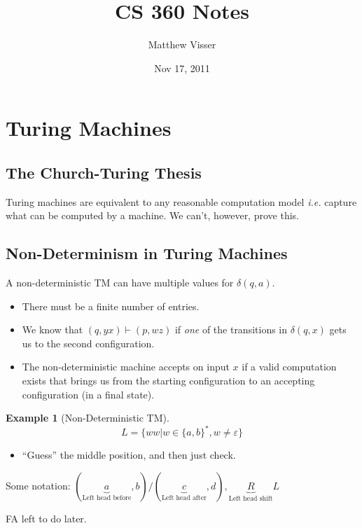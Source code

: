\documentclass[12pt]{article}
\theoremstyle{definition}
\newtheorem{exmpl}{Example}
\begin{document}
\title{CS 360 Notes}
\author{Matthew Visser}
\date{Nov 17, 2011}
\maketitle

\section{Turing Machines}

\subsection{The Church-Turing Thesis}

Turing machines are equivalent to any reasonable computation model \textit{i.e.}
capture what can be computed by a machine. We can't, however, prove this.

\subsection{Non-Determinism in Turing Machines}

A non-deterministic TM can have multiple values for $\delta(q,a)$.

\begin{itemize}
	\item There must be a finite number of entries.
	\item We know that $(q,yx) \vdash (p,wz)$ if \emph{one} of the transitions in
		$\delta(q,x)$ gets us to the second configuration.
	\item The non-deterministic machine accepts on input $x$ if a valid
		computation exists that brings us from the starting configuration to an
		accepting configuration (in a final state).
\end{itemize}

\begin{exmpl}[Non-Deterministic TM]
	\begin{equation}
		L = \{ ww | w \in \{a,b\}^*, w \neq \varepsilon \}
		\label{eq:ex1Lang}
	\end{equation}

	\begin{itemize}
		\item ``Guess'' the middle position, and then just check.
	\end{itemize}

	Some notation: $(\underbrace{a}_{\text{Left head
	before}},b)/(\underbrace{c}_{\text{Left head
	after}},d),\underbrace{R}_{\text{Left head shift}}L$

	FA left to do later.
\end{exmpl}
\end{document}
